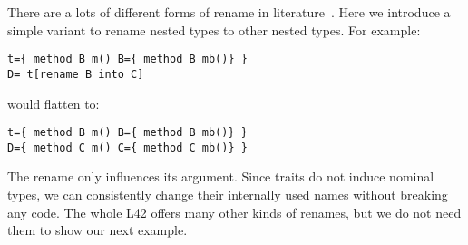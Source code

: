 


There are a lots of different forms of rename in
literature~\cite{deep,ancona2002calculus,bracha1992programming}.
Here we introduce a simple variant to rename nested types to other nested types.
For example:
\begin{lstlisting}
t={ method B m() B={ method B mb()} }
D= t[rename B into C]
\end{lstlisting}
\saveSpace
would flatten to:
\saveSpace
\begin{lstlisting}
t={ method B m() B={ method B mb()} }
D={ method C m() C={ method C mb()} }
\end{lstlisting}\saveSpace
The rename only influences its argument.
Since traits do not induce nominal types, we can
consistently change their
internally used names without breaking any code.
The whole L42 offers many other kinds of renames, but we do not need them to show our next example.

